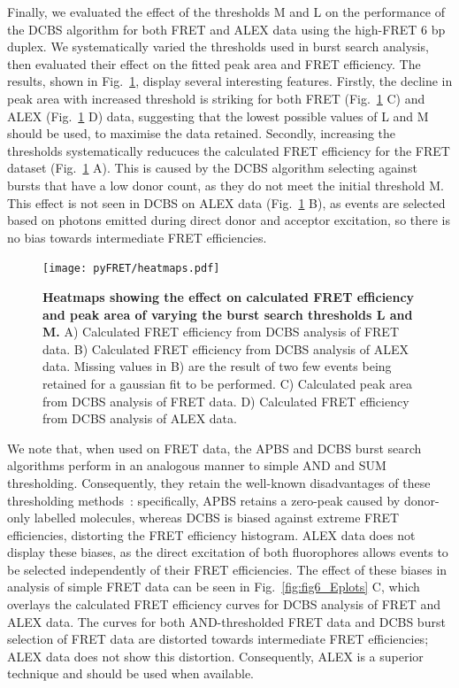 Finally, we evaluated the effect of the thresholds M and L on the performance of the DCBS algorithm for both FRET and ALEX data using the high-FRET 6 bp duplex. We systematically varied the thresholds used in burst search analysis, then evaluated their effect on the fitted peak area and FRET efficiency. The results, shown in Fig.~\ref{fig:fig8_heatmaps}, display several interesting features. Firstly, the decline in peak area with increased threshold is striking for both FRET (Fig.~\ref{fig:fig8_heatmaps} C) and ALEX (Fig.~\ref{fig:fig8_heatmaps} D) data, suggesting that the lowest possible values of L and M should be used, to maximise the data retained. Secondly, increasing the thresholds systematically reducuces the calculated FRET efficiency for the FRET dataset (Fig.~\ref{fig:fig8_heatmaps} A). This is caused by the DCBS algorithm selecting against bursts that have a low donor count, as they do not meet the initial threshold M. This effect is not seen in DCBS on ALEX data (Fig.~\ref{fig:fig8_heatmaps} B), as events are selected based on photons emitted during direct donor and acceptor excitation, so there is no bias towards intermediate FRET efficiencies.

\begin{figure}[!ht]
   \begin{center}
      \texttt{[image: pyFRET/heatmaps.pdf]}
      \caption{{\bf Heatmaps showing the effect on calculated FRET efficiency and peak area of varying the burst search thresholds L and M.} A) Calculated FRET efficiency from DCBS analysis of FRET data. B) Calculated FRET efficiency from DCBS analysis of ALEX data. Missing values in B) are the result of two few events being retained for a gaussian fit to be performed. C) Calculated peak area from DCBS analysis of FRET data. D) Calculated FRET efficiency from DCBS analysis of ALEX data.}
      \label{fig:fig8_heatmaps}
   \end{center}
\end{figure}

We note that, when used on FRET data, the APBS and DCBS burst search algorithms perform in an analogous manner to simple AND and SUM thresholding. Consequently, they retain the well-known disadvantages of these thresholding methods~\cite{murphy14}: specifically, APBS retains a zero-peak caused by donor-only labelled molecules, whereas DCBS is biased against extreme FRET efficiencies, distorting the FRET efficiency histogram. ALEX data does not display these biases, as the direct excitation of both fluorophores allows events to be selected independently of their FRET efficiencies. The effect of these biases in analysis of simple FRET data can be seen in Fig.~\ref{fig:fig6_Eplots} C, which overlays the calculated FRET efficiency curves for DCBS analysis of FRET and ALEX data. The curves for both AND-thresholded FRET data and DCBS burst selection of FRET data are distorted towards intermediate FRET efficiencies; ALEX data does not show this distortion. Consequently, ALEX is a superior technique and should be used when available.

